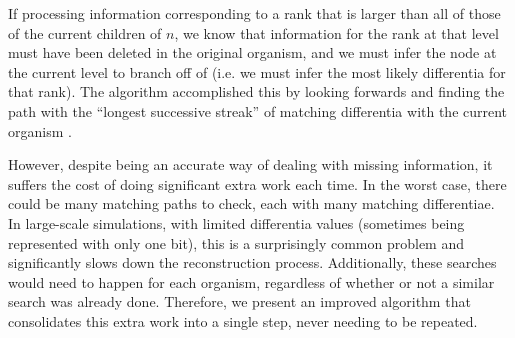 If processing information corresponding to a rank that is larger than all of those of the current children of $n$, we know that information for the rank at that level must have been deleted in the original organism, and we must infer the node at the current level to branch off of (i.e. we must infer the most likely differentia for that rank). The algorithm accomplished this by looking forwards and finding the path with the ``longest successive streak'' of matching differentia with the current organism \citep{moreno2024analysis}.



However, despite being an accurate way of dealing with missing information, it suffers the cost of doing significant extra work each time. In the worst case, there could be many matching paths to check, each with many matching differentiae. In large-scale simulations, with limited differentia values (sometimes being represented with only one bit), this is a surprisingly common problem and significantly slows down the reconstruction process. Additionally, these searches would need to happen for each organism, regardless of whether or not a similar search was already done. Therefore, we present an improved algorithm that consolidates this extra work into a single step, never needing to be repeated.
